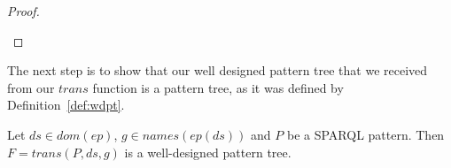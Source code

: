 \begin{proof}
\begin{enumerate}

	\end{enumerate}
\end{proof}

The next step is to show that our well designed pattern tree that we received
from our $trans$ function is a pattern tree, as it was defined by Definition~\ref{def:wdpt}.

\begin{lemma}
	Let $ds \in dom(ep)$, $g \in names(ep(ds))$ and $P$ be a SPARQL pattern.
	Then $F = trans(P,ds,g)$ is a well-designed pattern tree. 
\end{lemma}

